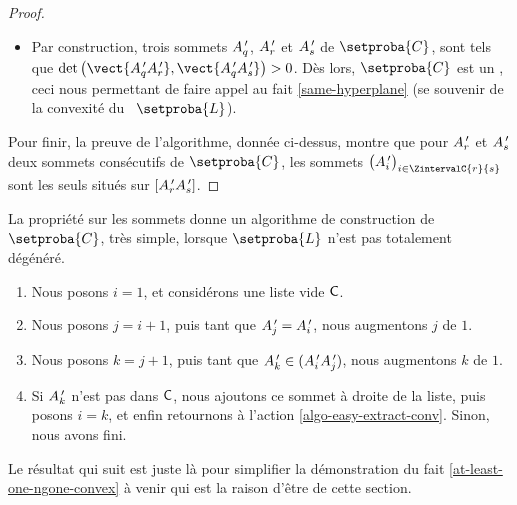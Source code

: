 \begin{proof}
\begin{itemize}
        \item Par construction, trois sommets  $A^{\,\prime}_q$, $A^{\,\prime}_r$ et $A^{\,\prime}_s$ de $\setproba{C}$, sont tels que $\det \big( \vect{\primeit{A}_q \primeit{A}_{r}}, \vect{\primeit{A}_q \primeit{A}_s} \big) > 0$.
        Dès lors, $\setproba{C}$ est un \kgone, ceci nous permettant de faire appel au fait \ref{same-hyperplane} (se souvenir de la convexité du \ncycle\ $\setproba{L}$).
    \end{itemize}

	
	Pour finir, la preuve de l'algorithme, donnée ci-dessus, montre que pour $A^{\,\prime}_r$ et $A^{\,\prime}_s$ deux sommets consécutifs de $\setproba{C}$, les sommets $\big( \primeit{A}_i \big)_{ i \in \ZintervalC{r}{s} }$ sont les seuls situés sur $[A^{\,\prime}_r A^{\,\prime}_s]$.
\end{proof}


\begin{remark}
    La propriété sur les sommets donne un algorithme de construction de $\setproba{C}$, très simple, lorsque $\setproba{L}$ n'est pas totalement dégénéré.
    \begin{enumerate}[label=\fbox{\small\bfseries\textsf{A\kern.25pt\arabic*}}]
        \item Nous posons $i = 1$, et considérons une liste vide $\mathsf{C}$.

        \item \label{algo-easy-extract-conv}
              Nous posons $j = i + 1$,
              puis
              tant que $A^{\,\prime}_j = A^{\,\prime}_i$, nous augmentons $j$ de $1$.

        \item Nous posons $k = j + 1$,
              puis
              tant que $A^{\,\prime}_k \in (A^{\,\prime}_i A^{\,\prime}_j)$, nous augmentons $k$ de $1$.

        \item Si $A^{\,\prime}_k$ n'est pas dans $\mathsf{C}$, nous ajoutons ce sommet à droite de la liste, puis posons $i = k$, et enfin retournons à l'action \ref{algo-easy-extract-conv}. Sinon, nous avons fini.
    \end{enumerate}
\end{remark}




%

Le résultat qui suit est juste là pour simplifier la démonstration du fait \ref{at-least-one-ngone-convex} à venir qui est la raison d'être de cette section.



